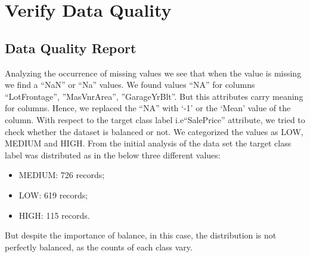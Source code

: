 

\section{Verify Data Quality}

\subsection{Data Quality Report}

Analyzing the occurrence of missing values we see that when the value is missing we find a “NaN” or “Na” values. We found values “NA” for columns “LotFrontage”, ”MasVnrArea”, ”GarageYrBlt”. But this attributes carry meaning for columns. Hence, we replaced the “NA” with ‘-1’ or the ‘Mean’ value of the column.  
With respect to the target class label i.e“SalePrice” attribute, we tried to check whether the dataset is balanced or not. We categorized the values as LOW, MEDIUM and HIGH. From the initial analysis of the data set the target class label was distributed as in the below three different values:
\begin{itemize}
    \item MEDIUM: 726 records;
    \item LOW: 619 records;
    \item HIGH: 115 records.
\end{itemize}
But despite the importance of balance, in this case, the distribution is not perfectly balanced, as the counts of each class vary.